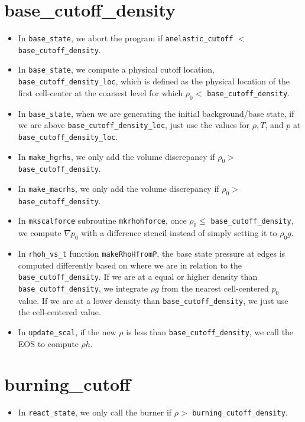 \documentclass[11pt]{article}
\begin{document}
\section{base\_cutoff\_density}
\begin{itemize}
\item In {\tt base\_state}, we abort the program if {\tt anelastic\_cutoff} $<$ {\tt base\_cutoff\_density}.
\item In {\tt base\_state}, we compute a physical cutoff location, {\tt base\_cutoff\_density\_loc}, which is defined as the physical location of the first cell-center at the coarsest level for which $\rho_0 <$ {\tt base\_cutoff\_density}.
\item In {\tt base\_state}, when we are generating the initial background/base state, if we are above {\tt base\_cutoff\_density\_loc}, just use the values for $\rho,T$, and $p$ at {\tt base\_cutoff\_density\_loc}.
\item In {\tt make\_hgrhs}, we only add the volume discrepancy if $\rho_0 >$ {\tt base\_cutoff\_density}.
\item In {\tt make\_macrhs}, we only add the volume discrepancy if $\rho_0 >$ {\tt base\_cutoff\_density}.
\item In {\tt mkscalforce} subroutine {\tt mkrhohforce}, once $\rho_0 \le$ {\tt base\_cutoff\_density}, we compute $\nabla p_0$ with a difference stencil instead of simply setting it to $\rho_0 g$.
\item In {\tt rhoh\_vs\_t} function {\tt makeRhoHfromP}, the base state pressure at edges is computed differently based on where we are in relation to the {\tt base\_cutoff\_density}.  If we are at a equal or higher density than {\tt base\_cutoff\_density}, we integrate $\rho g$ from the nearest cell-centered $p_0$ value.  If we are at a lower density than {\tt base\_cutoff\_density}, we just use the cell-centered value.
\item In {\tt update\_scal}, if the new $\rho$ is less than {\tt base\_cutoff\_density}, we call the EOS to compute $\rho h$.
\end{itemize}
\section{burning\_cutoff}
\begin{itemize}
\item In {\tt react\_state}, we only call the burner if $\rho >$ {\tt burning\_cutoff\_density}.
\end{itemize}
\end{document}
